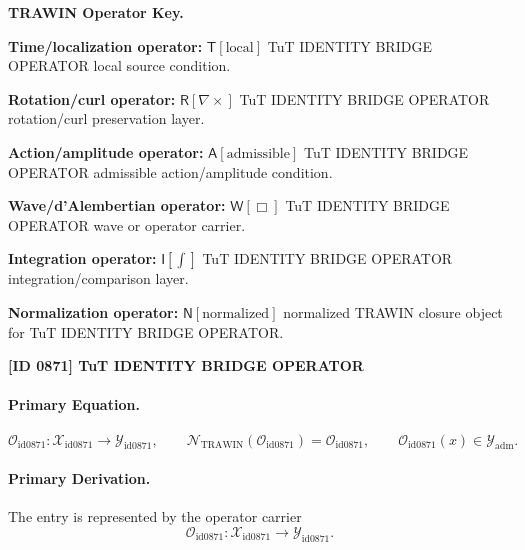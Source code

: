 \par\vspace{0.45\baselineskip}
\noindent\begin{minipage}[t]{\linewidth}
\begingroup
\small
\raggedright
\textbf{TRAWIN Operator Key.}\par
\noindent\textbf{Time/localization operator:} $\mathsf{T}\!\left[\mathrm{local}\right]$ TuT IDENTITY BRIDGE OPERATOR local source condition.\par
\noindent\textbf{Rotation/curl operator:} $\mathsf{R}\!\left[\nabla\times\right]$ TuT IDENTITY BRIDGE OPERATOR rotation/curl preservation layer.\par
\noindent\textbf{Action/amplitude operator:} $\mathsf{A}\!\left[\mathrm{admissible}\right]$ TuT IDENTITY BRIDGE OPERATOR admissible action/amplitude condition.\par
\noindent\textbf{Wave/d'Alembertian operator:} $\mathsf{W}\!\left[\Box\right]$ TuT IDENTITY BRIDGE OPERATOR wave or operator carrier.\par
\noindent\textbf{Integration operator:} $\mathsf{I}\!\left[\int\right]$ TuT IDENTITY BRIDGE OPERATOR integration/comparison layer.\par
\noindent\textbf{Normalization operator:} $\mathsf{N}\!\left[\mathrm{normalized}\right]$ normalized TRAWIN closure object for TuT IDENTITY BRIDGE OPERATOR.\par
\endgroup
\end{minipage}

\clearpage
\noindent\textbf{[ID 0871] TuT IDENTITY BRIDGE OPERATOR}\par
\vspace{0.35em}
\paragraph{Primary Equation.}
\[
\mathcal{O}_{\mathrm{id0871}}:\mathcal{X}_{\mathrm{id0871}}\longrightarrow \mathcal{Y}_{\mathrm{id0871}},\qquad
\mathcal{N}_{\mathrm{TRAWIN}}(\mathcal{O}_{\mathrm{id0871}})=\mathcal{O}_{\mathrm{id0871}},\qquad
\mathcal{O}_{\mathrm{id0871}}(x)\in\mathcal{Y}_{\mathrm{adm}}.
\]

\paragraph{Primary Derivation.} The entry is represented by the operator carrier\[
\mathcal{O}_{\mathrm{id0871}}:\mathcal{X}_{\mathrm{id0871}}\longrightarrow \mathcal{Y}_{\mathrm{id0871}}.
\]


